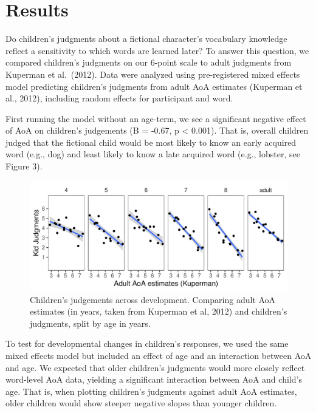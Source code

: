 \documentclass[10pt, letterpaper]{article}
\newenvironment{CodeChunk}{}{}
\begin{document}
\hypertarget{results}{%
\section{Results}\label{results}}

Do children's judgments about a fictional character's vocabulary
knowledge reflect a sensitivity to which words are learned later? To
answer this question, we compared children's judgments on our 6-point
scale to adult judgments from Kuperman et al.~(2012). Data were analyzed
using pre-registered mixed effects model predicting children's judgments
from adult AoA estimates (Kuperman et al., 2012), including random
effects for participant and word.

First running the model without an age-term, we see a significant
negative effect of AoA on children's judgements (B = -0.67, p
\textless{} 0.001). That is, overall children judged that the fictional
child would be most likely to know an early acquired word (e.g., dog)
and least likely to know a late acquired word (e.g., lobster, see Figure
3).

\begin{CodeChunk}
\begin{figure}[tb]
\includegraphics{figs/development-1} \caption[Children’s judgements across development]{Children’s judgements across development. Comparing adult AoA estimates (in years, taken from Kuperman et al, 2012) and children’s judgments, split by age in years.}\label{fig:development}
\end{figure}
\end{CodeChunk}

To test for developmental changes in children's responses, we used the
same mixed effects model but included an effect of age and an
interaction between AoA and age. We expected that older children's
judgments would more closely reflect word-level AoA data, yielding a
significant interaction between AoA and child's age. That is, when
plotting children's judgments against adult AoA estimates, older
children would show steeper negative slopes than younger children.
\end{document}
